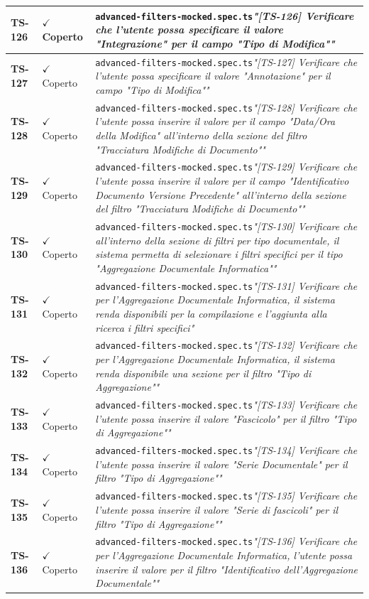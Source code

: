 \documentclass[a4paper,12pt]{article}
\newcommand{\ok}{\textcolor{green!60!black}{$\checkmark$ Coperto}}
\newcommand{\f}[1]{\nolinkurl{#1}\newline}
\newcommand{\q}[1]{\textit{#1}}
\begin{document}
\begin{longtable}{|p{1.5cm}|p{3.0cm}|p{10.5cm}|}
\textbf{TS-126} & \ok & \f{advanced-filters-mocked.spec.ts}\q{"[TS-126] Verificare che l'utente possa specificare il valore "Integrazione" per il campo "Tipo di Modifica""} \\ \hline
\textbf{TS-127} & \ok & \f{advanced-filters-mocked.spec.ts}\q{"[TS-127] Verificare che l'utente possa specificare il valore "Annotazione" per il campo "Tipo di Modifica""} \\ \hline
\textbf{TS-128} & \ok & \f{advanced-filters-mocked.spec.ts}\q{"[TS-128] Verificare che l'utente possa inserire il valore per il campo "Data/Ora della Modifica" all'interno della sezione del filtro "Tracciatura Modifiche di Documento""} \\ \hline
\textbf{TS-129} & \ok & \f{advanced-filters-mocked.spec.ts}\q{"[TS-129] Verificare che l'utente possa inserire il valore per il campo "Identificativo Documento Versione Precedente" all'interno della sezione del filtro "Tracciatura Modifiche di Documento""} \\ \hline
\textbf{TS-130} & \ok & \f{advanced-filters-mocked.spec.ts}\q{"[TS-130] Verificare che all'interno della sezione di filtri per tipo documentale, il sistema permetta di selezionare i filtri specifici per il tipo "Aggregazione Documentale Informatica""} \\ \hline
\textbf{TS-131} & \ok & \f{advanced-filters-mocked.spec.ts}\q{"[TS-131] Verificare che per l'Aggregazione Documentale Informatica, il sistema renda disponibili per la compilazione e l'aggiunta alla ricerca i filtri specifici"} \\ \hline
\textbf{TS-132} & \ok & \f{advanced-filters-mocked.spec.ts}\q{"[TS-132] Verificare che per l'Aggregazione Documentale Informatica, il sistema renda disponibile una sezione per il filtro "Tipo di Aggregazione""} \\ \hline
\textbf{TS-133} & \ok & \f{advanced-filters-mocked.spec.ts}\q{"[TS-133] Verificare che l'utente possa inserire il valore "Fascicolo" per il filtro "Tipo di Aggregazione""} \\ \hline
\textbf{TS-134} & \ok & \f{advanced-filters-mocked.spec.ts}\q{"[TS-134] Verificare che l'utente possa inserire il valore "Serie Documentale" per il filtro "Tipo di Aggregazione""} \\ \hline
\textbf{TS-135} & \ok & \f{advanced-filters-mocked.spec.ts}\q{"[TS-135] Verificare che l'utente possa inserire il valore "Serie di fascicoli" per il filtro "Tipo di Aggregazione""} \\ \hline
\textbf{TS-136} & \ok & \f{advanced-filters-mocked.spec.ts}\q{"[TS-136] Verificare che per l'Aggregazione Documentale Informatica, l'utente possa inserire il valore per il filtro "Identificativo dell'Aggregazione Documentale""} \\ \hline

\end{longtable}
\end{document}
